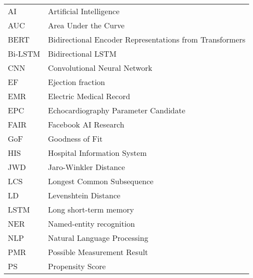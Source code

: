\thispagestyle{plain}

\begin{tabular}{lp{10cm}}
	AI      & Artificial Intelligence                                                     \\
	AUC     & Area Under the Curve                                                        \\
	BERT    & Bidirectional Encoder Representations from Transformers                     \\
	Bi-LSTM & Bidirectional LSTM                                                          \\
	CNN     & Convolutional Neural Network                                                \\
	EF      & Ejection fraction                                                           \\
	EMR     & Electric Medical Record                                                     \\
	EPC     & Echocardiography Parameter Candidate                                        \\
	FAIR    & Facebook AI Research                                                        \\         
	GoF     & Goodness of Fit                                                             \\ 
	HIS     & Hospital Information System                                                 \\
	JWD     & Jaro-Winkler Distance                                                       \\
	LCS     & Longest Common Subsequence                                                  \\
	LD      & Levenshtein Distance                                                        \\
	LSTM    & Long short-term memory                                                      \\
	NER     & Named-entity recognition                                                    \\
	NLP     & Natural Language Processing                                                 \\
	PMR     & Possible Measurement Result                                                 \\
	PS      & Propensity Score                                                            \\

\end{tabular}
